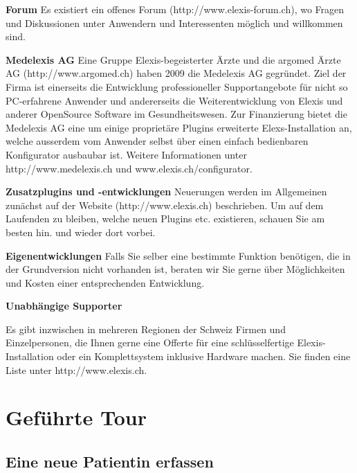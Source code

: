 \documentclass[paper=a4,BCOR8.25mm,twoside]{scrbook}
\begin{document}
\bigskip

\textbf{Forum}
Es existiert ein offenes Forum (http://www.elexis-forum.ch), wo Fragen und Diskussionen unter Anwendern und Interessenten möglich und willkommen sind.

\bigskip

\textbf{Medelexis AG}
Eine Gruppe Elexis-begeisterter Ärzte und die argomed Ärzte AG (http://www.argomed.ch) haben 2009 die Medelexis AG gegründet. Ziel der Firma ist einerseits die Entwicklung professioneller Supportangebote für nicht so PC-erfahrene Anwender und andererseits die Weiterentwicklung von Elexis und anderer OpenSource Software im Gesundheitswesen. Zur Finanzierung bietet die Medelexis AG eine um einige proprietäre Plugins erweiterte Elexs-Installation an, welche ausserdem vom Anwender selbst über einen einfach bedienbaren Konfigurator ausbaubar ist. Weitere Informationen unter http://www.medelexis.ch und www.elexis.ch/configurator.  

\bigskip

\textbf{Zusatzplugins und -entwicklungen}
Neuerungen werden im Allgemeinen zunächst auf der Website (http://www.elexis.ch) beschrieben. Um auf dem Laufenden zu bleiben, welche neuen Plugins etc. existieren, schauen Sie am besten hin. und wieder dort vorbei.

\bigskip
{}
\textbf{Eigenentwicklungen}
Falls Sie selber eine bestimmte Funktion benötigen, die in der Grundversion nicht vorhanden ist, beraten wir Sie gerne über Möglichkeiten und Kosten einer entsprechenden Entwicklung.

\bigskip
\textbf{Unabhängige Supporter}

Es gibt inzwischen in mehreren Regionen der Schweiz Firmen und Einzelpersonen, die Ihnen gerne eine Offerte für eine schlüsselfertige Elexis-Installation oder ein Komplettsystem inklusive Hardware machen. Sie finden eine Liste unter http://www.elexis.ch.

\part{Geführte Tour}
\chapter{Eine neue Patientin erfassen}
\label{tour}
	
\end{document}
